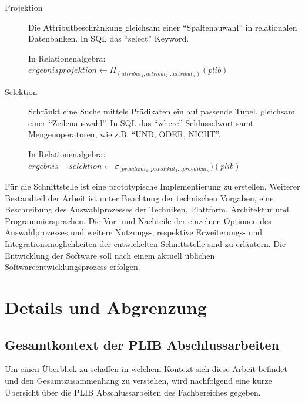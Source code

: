 \begin{description}
\item[Projektion] Die Attributbeschränkung gleichsam einer \enquote{Spaltenauwahl} in relationalen Datenbanken. In SQL das \enquote{select} Keyword.   

In Relationenalgebra:
$ergebnisprojektion \leftarrow  \Pi_{(attribut_1, attribut_2... attribut_n)}(plib)$ \\

\item[Selektion] Schränkt eine Suche mittels Prädikaten ein auf passende Tupel, gleichsam einer \enquote{Zeilenauswahl}. In SQL das \enquote{where} Schlüsselwort samt Mengenoperatoren, wie z.B. \enquote{UND, ODER, NICHT}.

In Relationenalgebra:
$ergebnis-selektion \leftarrow  \sigma_{(praedikat_1, praedikat_2... praedikat_n})(plib)$ \\

\end{description}

Für die Schnittstelle ist eine prototypische Implementierung zu erstellen. Weiterer Bestandteil der Arbeit ist unter Beachtung der technischen Vorgaben, eine Beschreibung des Auswahlprozesses der Techniken, Plattform, Architektur und Programmiersprachen. Die Vor- und Nachteile der einzelnen Optionen des Auswahlprozesses und weitere Nutzungs-, respektive Erweiterungs- und Integrationsmöglichkeiten der entwickelten Schnittstelle sind zu erläutern. 
Die Entwicklung der Software soll nach einem aktuell üblichen Softwareentwicklungsprozess erfolgen. 

\section{Details und Abgrenzung}

\subsection{Gesamtkontext der PLIB Abschlussarbeiten}

Um einen Überblick zu schaffen in welchem Kontext sich diese Arbeit befindet und den Gesamtzusammenhang zu verstehen, wird nachfolgend eine kurze Übersicht über die PLIB Abschlussarbeiten des Fachbereiches gegeben.


